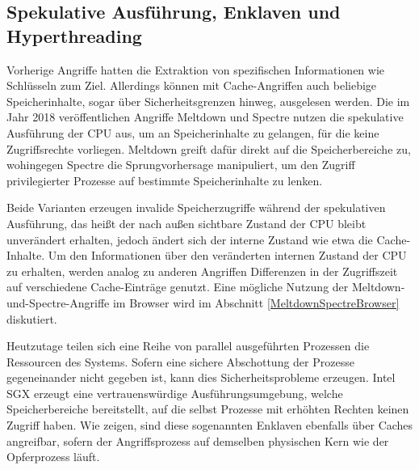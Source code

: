 

\subsection{Spekulative Ausführung, Enklaven und Hyperthreading}
\label{relatedWorkHyperthreading}


Vorherige Angriffe hatten die Extraktion von spezifischen Informationen wie Schlüsseln zum Ziel. Allerdings können mit Cache-Angriffen auch beliebige Speicherinhalte, sogar über Sicherheitsgrenzen hinweg, ausgelesen werden.
Die im Jahr 2018 veröffentlichen Angriffe Meltdown \cite{MeltdownPaper} und Spectre \cite{SpectrePaper} nutzen die spekulative Ausführung der CPU aus, um an Speicherinhalte zu gelangen, für die keine Zugriffsrechte vorliegen.
Meltdown greift dafür direkt auf die Speicherbereiche zu, wohingegen Spectre die Sprungvorhersage manipuliert, um den Zugriff privilegierter Prozesse auf bestimmte Speicherinhalte zu lenken.

Beide Varianten erzeugen invalide Speicherzugriffe während der spekulativen Ausführung, das heißt der nach außen sichtbare Zustand der CPU bleibt unverändert erhalten, jedoch ändert sich der interne Zustand wie etwa die Cache-Inhalte.
Um den Informationen über den veränderten internen Zustand der CPU zu erhalten, werden analog zu anderen Angriffen Differenzen in der Zugriffszeit auf verschiedene Cache-Einträge genutzt.
Eine mögliche Nutzung der Meltdown-und-Spectre-Angriffe im Browser wird im Abschnitt \ref{MeltdownSpectreBrowser} diskutiert.

Heutzutage teilen sich eine Reihe von parallel ausgeführten Prozessen die Ressourcen des Systems.
Sofern eine sichere Abschottung der Prozesse gegeneinander nicht gegeben ist, kann dies Sicherheitsprobleme erzeugen.
Intel SGX erzeugt eine vertrauenswürdige Ausführungsumgebung, welche Speicherbereiche bereitstellt, auf die selbst Prozesse mit erhöhten Rechten keinen Zugriff haben.
Wie \cite{CacheZoom,CacheAttacksIntelSGX} zeigen, sind diese sogenannten Enklaven ebenfalls über Caches angreifbar, sofern der Angriffsprozess auf demselben physischen Kern wie der Opferprozess läuft.

